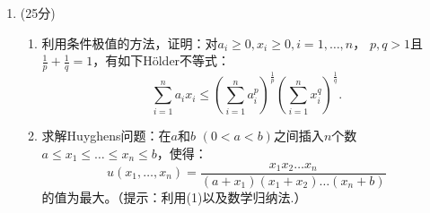 \begin{enumerate}
\begin{enumerate}[label=(\arabic*)]
    定义$F(x)=\langle f(x),g(x) \rangle\ (x\in\R^n)$。求$F'(x)$。
    \item 回忆线性变换$A:\R^n\to\R^n$的范数定义为$\|A\|=\max_{\|x\|\le1}\|Ax\|$。
    若$f:\R^n\to\R^m$且$f\in C^1(\R^n)$，证明：
    \[\|f(x)-f(y)\|\le\sup_{0\le t\le1}\|f'(tx+(1-t)y)\|\|x-y\|.\]
    \end{enumerate}
    \item[八] (25分) \begin{enumerate}[label=(\arabic*)]
    \item 利用条件极值的方法，证明：对$a_i\ge0,x_i\ge0,i=1,\dots,n$，
    $p,q>1$且$\frac{1}{p}+\frac{1}{q}=1$，有如下Hölder不等式：
    \[\sum_{i=1}^na_ix_i\le\left(\sum_{i=1}^na_i^p\right)^\frac{1}{p}
    \left(\sum_{i=1}^nx_i^q\right)^\frac{1}{q}.\]
    \item 求解Huyghens问题：在$a$和$b$ $(0<a<b)$之间插入$n$个数$a\le x_1\le\dots\le x_n\le b$，使得：
    \[u(x_1,\dots,x_n)=\frac{x_1x_2\dots x_n}{(a+x_1)(x_1+x_2)\dots(x_n+b)}\]
    的值为最大。（提示：利用(1)以及数学归纳法.）
    \end{enumerate}
\end{enumerate}

